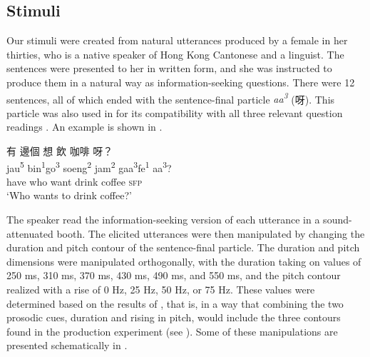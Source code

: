 \documentclass[output=paper,colorlinks,citecolor=brown            ,chinesefont]{langscibook}
\begin{document}
\subsection{Stimuli}\label{subsubsec:stimuli}

Our stimuli were created from natural utterances produced by a female in her thirties, who is a native speaker of Hong Kong Cantonese and a linguist. The sentences were presented to her in written form, and she was instructed to produce them in a natural way as information-seeking questions. There were 12 sentences, all of which ended with the sentence-final particle \textit{aa\textsuperscript{3}} ({\cn 呀}). This particle was also used in \citet{Lo+2019} for its compatibility with all three relevant question readings \citep[1760]{Sybesma+2007}. An example is shown in .

\begin{exe}
\let\eachwordone=\cn
\ex\label{stimulus} \glll 有 邊個 想 飲 咖啡 呀？\\
jau\textsuperscript{5} bin\textsuperscript{1}go\textsuperscript{3} soeng\textsuperscript{2} jam\textsuperscript{2} gaa\textsuperscript{3}fe\textsuperscript{1} aa\textsuperscript{3}? \\
have who want drink coffee \textsc{sfp}\\
\trans `Who wants to drink coffee?'
\end{exe}

The speaker read the information-seeking version of each utterance in a sound-attenuated booth. The elicited utterances were then manipulated by changing the duration and pitch contour of the sentence-final particle. The duration and pitch dimensions were manipulated orthogonally, with the duration taking on values of 250 ms, 310 ms, 370 ms, 430 ms, 490 ms, and 550 ms, and the pitch contour realized with a rise of 0 Hz, 25 Hz, 50 Hz, or 75 Hz. These values were determined based on the results of \citet{Lo+2019}, that is, in a way that combining the two prosodic cues, duration and rising in pitch, would include the three contours found in the production experiment (see ). Some of these manipulations are presented schematically in .

\end{document}

